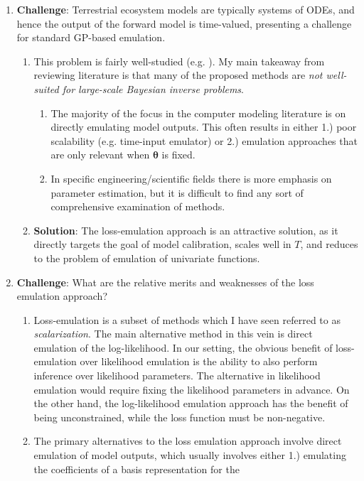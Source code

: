 \documentclass[12pt]{article}
\newcommand{\btheta}{\boldsymbol{\theta}}
\begin{document}
\begin{enumerate}
\item \textbf{Challenge}: Terrestrial ecosystem models are typically systems of ODEs, and hence the output of the forward model is time-valued, presenting a challenge for standard GP-based emulation. 
	\begin{enumerate}
	\item This problem is fairly well-studied (e.g. \cite{10.1093/biomet/asp028, doi:10.1198/016214507000000888, acp-11-12253-2011, MOHAMMADI2019178, 10.1214/09-BA415, doi:10.1137/120900915, psf2021003011}). 
	My main takeaway from reviewing literature is that many of the proposed methods are \textit{not well-suited for large-scale Bayesian inverse problems}. 
		\begin{enumerate}
		\item The majority of the focus in the computer modeling literature is on directly emulating model outputs. This often results in either 1.) poor scalability (e.g. time-input emulator) or 2.) emulation approaches 
		that are only relevant when $\btheta$ is fixed. 
		\item In specific engineering/scientific fields there is more emphasis on parameter estimation, but it is difficult to find any sort of comprehensive examination of methods. 
		\end{enumerate}
		\item \textbf{Solution}: The loss-emulation approach is an attractive solution, as it directly targets the goal of model calibration, scales well in $T$, and reduces to the problem of emulation of univariate 
		functions. 
	\end{enumerate}
\item \textbf{Challenge}: What are the relative merits and weaknesses of the loss emulation approach? 
	\begin{enumerate} 
	\item Loss-emulation is a subset of methods which I have seen referred to as \textit{scalarization}. The main alternative method in this vein is direct emulation of the log-likelihood. 
	In our setting, the obvious benefit of loss-emulation over likelihood emulation is the ability to also perform inference over likelihood parameters. The alternative in likelihood emulation would 
	require fixing the likelihood parameters in advance. On the other hand, the log-likelihood emulation approach has the benefit of being unconstrained, while the loss function must be non-negative. 
	\item The primary alternatives to the loss emulation approach involve direct emulation of model outputs, which usually involves either 1.) emulating the coefficients of a basis representation for the 

\end{enumerate}
\end{enumerate}
\end{document}
